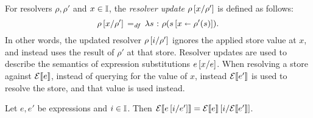 \documentclass[11pt]{report}
\begin{document}
For resolvers $\rho,\rho'$ and $x \in \mathbb{I}$, the \emph{resolver update} $\rho\left[x / \rho'\right]$ is defined as follows: \[ \rho\left[x / \rho'\right] \operatorname{\;=_{\mathit{df}}\;} \lambda s \operatorname{\,:\,} \rho(s \left[ x \shortleftarrow \rho'(s) \right]). \] In other words, the updated resolver $\rho \left[i / \rho'\right]$ ignores the applied store value at $x$, and instead uses the result of $\rho'$ at that store. Resolver updates are used to describe the semantics of expression substitutions $e \left[x / e\right]$. When resolving a store against $\mathcal{E}[\![e]\!]$, instead of querying for the value of $x$, instead $\mathcal{E}[\![e']\!]$ is used to resolve the store, and that value is used instead. 

\begin{lemma}
  \label{lem:exp-sem-subst}
  Let $e,e'$ be expressions and $i \in \mathbb{I}$. Then $\mathcal{E}[\![e\left[i / e'\right]]\!] = \mathcal{E}[\![e]\!]\left[i / \mathcal{E}[\![e']\!]\right]$.
\end{lemma}
\end{document}

